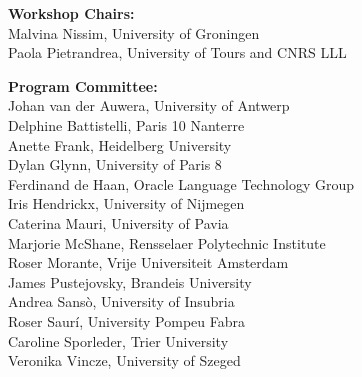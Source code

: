 \documentclass[11pt]{article}
\begin{document}



\begin{description}

\item{\bf Workshop Chairs:} \vspace{2mm} \\
Malvina Nissim, University of Groningen\\
Paola Pietrandrea, University of Tours and CNRS LLL


\vspace{3mm}
\item{\bf Program Committee:}\vspace{2mm} \\
Johan van der Auwera, University of Antwerp \\
Delphine Battistelli, Paris 10 Nanterre\\
Anette Frank, Heidelberg University\\
Dylan Glynn, University of Paris 8\\
Ferdinand de Haan, Oracle Language Technology Group\\
Iris Hendrickx, University of Nijmegen\\
Caterina Mauri, University of Pavia\\
Marjorie McShane, Rensselaer Polytechnic Institute\\
Roser Morante, Vrije Universiteit Amsterdam\\
James Pustejovsky, Brandeis University\\
Andrea Sans\`{o}, University of Insubria\\
Roser Saur\'{i}, University Pompeu Fabra\\
Caroline Sporleder, Trier University\\
Veronika Vincze, University of Szeged\\



\end{description}
\end{document}
